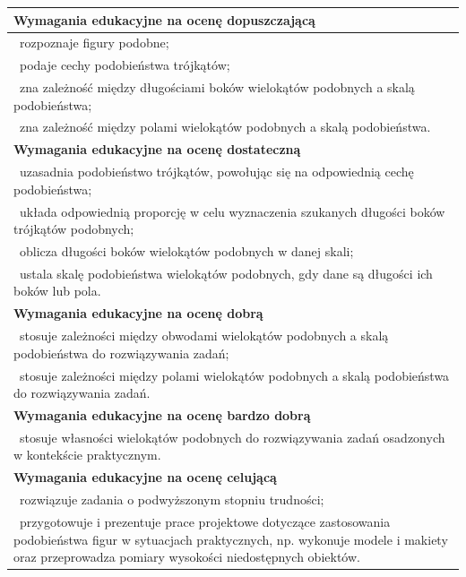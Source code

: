 \documentclass[12pt,a4paper]{article}
\begin{document}
	\begin{longtable}{|p{16cm}|}
		\hline
		
		\textbf{Wymagania edukacyjne na ocenę dopuszczającą} \\ \hline
		
		\textbullet\ rozpoznaje figury podobne; \\
		
		\textbullet\ podaje cechy podobieństwa trójkątów; \\
		
		\textbullet\ zna zależność między długościami boków wielokątów podobnych a skalą podobieństwa; \\
		
		\textbullet\ zna zależność między polami wielokątów podobnych a skalą podobieństwa. \\ \hline
		
		\textbf{Wymagania edukacyjne na ocenę dostateczną} \\ \hline
		
		\textbullet\ uzasadnia podobieństwo trójkątów, powołując się na odpowiednią cechę podobieństwa; \\
		
		\textbullet\ układa odpowiednią proporcję w celu wyznaczenia szukanych długości boków trójkątów podobnych; \\
		
		\textbullet\ oblicza długości boków wielokątów podobnych w danej skali; \\
		
		\textbullet\ ustala skalę podobieństwa wielokątów podobnych, gdy dane są długości ich boków lub pola. \\ \hline
		
		\textbf{Wymagania edukacyjne na ocenę dobrą} \\ \hline
		
		\textbullet\ stosuje zależności między obwodami wielokątów podobnych a skalą podobieństwa do rozwiązywania zadań; \\
		
		\textbullet\ stosuje zależności między polami wielokątów podobnych a skalą podobieństwa do rozwiązywania zadań. \\ \hline
		
		\textbf{Wymagania edukacyjne na ocenę bardzo dobrą} \\ \hline
		
		\textbullet\ stosuje własności wielokątów podobnych do rozwiązywania zadań osadzonych w kontekście praktycznym. \\ \hline
		
		\textbf{Wymagania edukacyjne na ocenę celującą} \\ \hline
		
		\textbullet\ rozwiązuje zadania o podwyższonym stopniu trudności; \\
		
		\textbullet\ przygotowuje i prezentuje prace projektowe dotyczące zastosowania podobieństwa figur w sytuacjach praktycznych, np. wykonuje modele i makiety oraz przeprowadza pomiary wysokości niedostępnych obiektów. \\ \hline
		
	\end{longtable}
	
\end{document}
